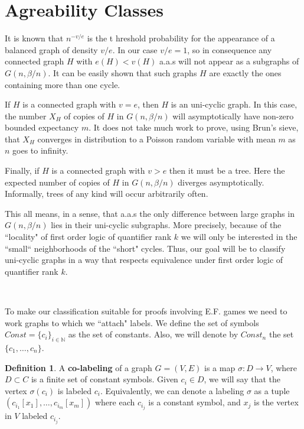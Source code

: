 \documentclass[11pt,notitlepage]{report}
\theoremstyle{definition}
\newtheorem{definition}{Definition}[chapter]
\newcommand{\N}{\mathbb{N}}
\begin{document}
\section{Agreability Classes}


It is known that $n^{-v/e}$ is the t
hreshold probability for the appearance 
of a balanced graph of density $v/e$. 
In our case $v/e=1$, so in consequence any connected graph $H$
with $e(H)< v(H)$ a.a.s will not appear 
as a subgraphs of $G(n,\beta/n)$. It can be easily 
shown that such graphs $H$ are exactly 
the ones containing more than one cycle. \par

If $H$ is a connected graph with $v=e$, then $H$ is an uni-cyclic graph.
In this case, the number $X_H$ of copies of $H$ 
in $G(n,\beta/n)$ will asymptotically have non-zero bounded expectancy $m$. 
It does not take much work to prove, using Brun's sieve, 
that $X_H$ converges in distribution to a Poisson 
random variable with mean $m$ as $n$ goes to infinity.  \par

Finally, if $H$ is a connected graph 
with $v>e$ then it must be a tree. Here 
the expected number of copies of $H$ 
in $G(n,\beta/n)$ diverges asymptotically. 
Informally, trees of any kind will occur arbitrarily often. \par

This all means, in a sense, that a.a.s the only 
difference between large graphs in $G(n,\beta/n)$
lies in their uni-cyclic subgraphs. More precisely,
because of the ``locality" of first order logic of quantifier 
rank $k$ we will only be interested in the 
``small`` neighborhoods of the ``short" cycles.  
Thus, our goal will be to classify uni-cyclic graphs
in a way that respects equivalence under first 
order logic of quantifier rank $k$. \par
~\par
To make our classification suitable for proofs 
involving E.F. games we need to work graphs to which we ``attach" labels. 
We define the set of symbols $Const=\{c_i\}_{i\in \N}$ 
as the set of constants. Also, we will denote by
$Const_n$ the set $\{c_1,\dots, c_n\}$.
 
\begin{definition} 
	A \textbf{co-labeling} of a graph $G=(V,E)$ is a map 
	$\sigma: D\rightarrow V$, where $D\subset C$ is a 
	finite set of constant symbols. Given $c_i\in D$, 
	we will say that the vertex $\sigma(c_i)$ is labeled $c_i$.
	Equivalently, we can denote a labeling $\sigma$ as a tuple
	$(c_{i_1}[x_1],\dots, c_{i_m}[x_m])$ where each $c_{i_j}$
	 is a constant symbol, and $x_j$ is the vertex
	in $V$ labeled $c_{i_j}$.
\end{definition}
\end{document}
